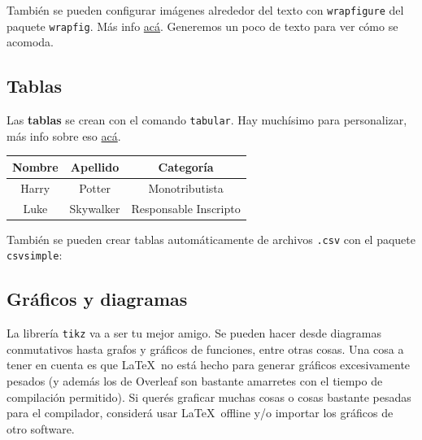 \documentclass[12pt, spanish]{article}
\theoremstyle{definition} %
\theoremstyle{remark} %
\theoremstyle{plain} %
\theoremstyle{plain} %
\theoremstyle{plain} %
\theoremstyle{plain} %
\theoremstyle{plain} %
\theoremstyle{remark} %
\begin{document}
También se pueden configurar imágenes alrededor del texto con \verb|wrapfigure| del paquete \verb|wrapfig|. Más info \href{https://www.overleaf.com/learn/latex/Wrapping_text_around_figures}{acá}. Generemos un poco de texto para ver cómo se acomoda.

\lipsum[1] %

\subsection{Tablas}

Las \textbf{tablas} se crean con el comando \verb|tabular|. Hay muchísimo para personalizar, más info sobre eso \href{https://www.overleaf.com/learn/latex/Tables}{acá}.
\begin{center}
    \begin{tabular}{ ||c|c|c|| } 
     \hline
     Nombre & Apellido & Categoría \\ 
     \hline
     Harry & Potter & Monotributista \\ 
     Luke & Skywalker & Responsable Inscripto \\ 
     \hline
    \end{tabular}
\end{center}
También se pueden crear tablas automáticamente de archivos \verb|.csv| con el paquete \verb|csvsimple|:

\begin{center}
\end{center}

\subsection{Gráficos y diagramas}

La librería \verb|tikz| va a ser tu mejor amigo. Se pueden hacer desde diagramas conmutativos hasta grafos y gráficos de funciones, entre otras cosas. Una cosa a tener en cuenta es que \LaTeX\ no está hecho para generar gráficos excesivamente pesados (y además los de Overleaf son bastante amarretes con el tiempo de compilación permitido). Si querés graficar muchas cosas o cosas bastante pesadas para el compilador, considerá usar \LaTeX\ offline y/o importar los gráficos de otro software.
\end{document}
